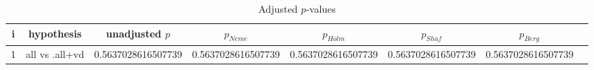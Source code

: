 \documentclass[a4paper,10pt]{article}
\begin{document}
\begin{landscape}
\begin{itemize}


\end{itemize}


\begin{table}[!htp]
\centering\tiny
\caption{Adjusted $p$-values}
\begin{tabular}{cccccccc}
i&hypothesis&unadjusted $p$&$p_{Neme}$&$p_{Holm}$&$p_{Shaf}$&$p_{Berg}$\\
\hline
1&all vs .all+vd&0.5637028616507739&0.5637028616507739&0.5637028616507739&0.5637028616507739&0.5637028616507739\\\hline
\end{tabular}
\end{table}

\end{landscape}
\end{document}
